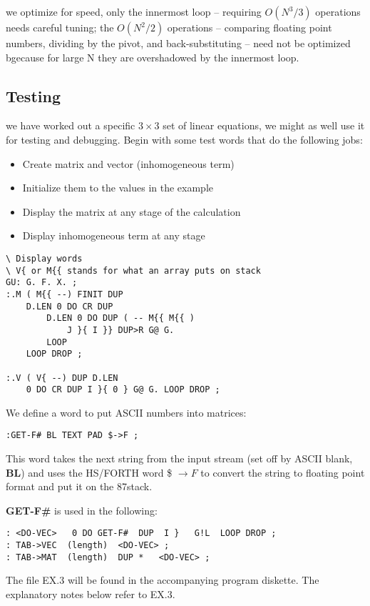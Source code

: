  we optimize for speed, only the innermost loop -- requiring $O (N^3 /3)$ operations needs careful tuning; the $O (N^2/2)$ 
operations -- comparing floating point numbers, dividing by the pivot, and
back-substituting -- need not be optimized bgecause for
large N they are overshadowed by the innermost loop.

\subsection{Testing}
 we have worked out a specific $3 \times 3$ set of linear equations,
we might as well use it for testing and debugging. Begin with
some test words that do the following jobs:

\begin{itemize}
  \item Create matrix and vector (inhomogeneous term)
  \item Initialize them to the values in the example
  \item Display the matrix at any stage of the calculation
  \item Display inhomogeneous term at any stage
\end{itemize}
\begin{verbatim}
\ Display words
\ V{ or M{{ stands for what an array puts on stack
GU: G. F. X. ;
:.M ( M{{ --) FINIT DUP
    D.LEN 0 DO CR DUP
        D.LEN 0 DO DUP ( -- M{{ M{{ )
            J }{ I }} DUP>R G@ G.
        LOOP
    LOOP DROP ;

:.V ( V{ --) DUP D.LEN
    0 DO CR DUP I }{ 0 } G@ G. LOOP DROP ;
\end{verbatim}

We define a word to put ASCII numbers into matrices:
\begin{verbatim}
:GET-F# BL TEXT PAD $->F ;
\end{verbatim}

This word takes the next string from the input stream (set off
by ASCII blank, \textbf{BL}) and uses the HS/FORTH word \$ $\to F$ to
convert the string to floating point format and put it on the
87stack.

\textbf{GET-F\#} is used in the following:
\begin{verbatim}
: <DO-VEC>   0 DO GET-F#  DUP  I }   G!L  LOOP DROP ;
: TAB->VEC  (length)  <DO-VEC> ;
: TAB->MAT  (length)  DUP *   <DO-VEC> ;
\end{verbatim}

The file EX.3 will be found in the accompanying program diskette. The explanatory notes below refer to EX.3.

